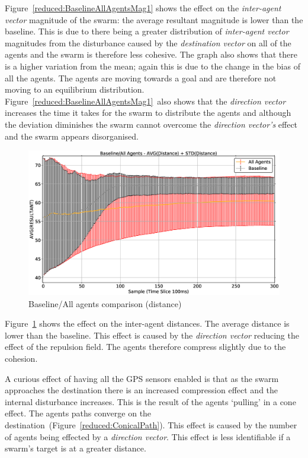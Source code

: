 Figure~\ref{reduced:BaselineAllAgentsMag1} shows the effect on the \textit{inter-agent vector} magnitude of the swarm: the average resultant magnitude is lower than the baseline. This is due to there being a greater distribution of \textit{inter-agent vector} magnitudes from the disturbance caused by the \textit{destination vector} on all of the agents and the swarm is therefore less cohesive. The graph also shows that there is a higher variation from the mean; again this is due to the change in the bias of all the agents. The agents are moving towards a goal and are therefore not moving to an equilibrium distribution. Figure~\ref{reduced:BaselineAllAgentsMag1}~also shows that the \textit{direction vector} increases the time it takes for the swarm to distribute the agents and although the deviation diminishes the swarm cannot overcome the \textit{direction vector's} effect and the swarm appears disorganised.
\begin{figure}[H]
\begin{center}
\includegraphics[width=14cm]{CHAPTER-6/figures/BaselineAllAgentsDist1}
\end{center}
\caption{Baseline/All agents comparison (distance)\label{reduced:BaselineAllAgentsDist1}}
\end{figure}

Figure~\ref{reduced:BaselineAllAgentsDist1} shows the effect on the inter-agent distances. The average distance is lower than the baseline. This effect is caused by the \textit{direction vector} reducing the effect of the repulsion field. The agents therefore compress slightly due to the cohesion.

A curious effect of having all the GPS sensors enabled is that as the swarm approaches the destination there is an increased compression effect and the internal disturbance increases. This is the result of the agents `pulling' in a cone effect. The agents paths converge on the destination~(Figure~\ref{reduced:ConicalPath}). This effect is caused by the number of agents being effected by a \textit{direction vector}. This effect is less identifiable if a swarm's target is at a greater distance.  


